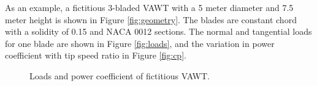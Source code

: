 \documentclass{article}
\begin{document}
As an example, a fictitious 3-bladed VAWT with a 5 meter diameter and 7.5 meter height is shown in Figure \ref{fig:geometry}.  The blades are constant chord with a solidity of 0.15 and NACA 0012 sections.  The normal and tangential loads for one blade are shown in Figure \ref{fig:loads}, and the variation in power coefficient with tip speed ratio in Figure \ref{fig:cp}.





\begin{figure}[htbp]
\centering
 \qquad
 \caption{Loads and power coefficient of fictitious VAWT.}
\end{figure}
\end{document}
